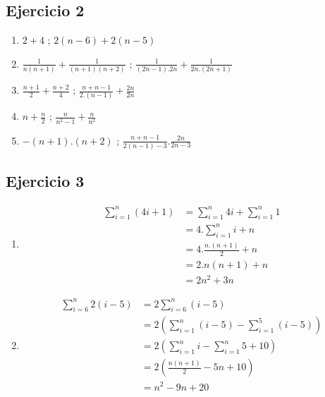 \subsection{Ejercicio 2}
\begin{enumerate}[label=(\alph*)]
    \item $2+4$ ; $2(n-6)+ 2(n-5)$
    \item $\frac{1}{n(n+1)} + \frac{1}{(n+1)(n+2)}$ ; $\frac{1}{(2n-1).2n} + \frac{1}{2n.(2n+1)}$
    \item $\frac{n+1}{2} + \frac{n+2}{4}$ ; $\frac{n+n-1}{2.(n-1)} + \frac{2n}{2n}$
    \item $n + \frac{n}{2}$ ; $\frac{n}{n^2-1} + \frac{n}{n^2}$
    \item $-(n+1) . (n+2)$ ; $\frac{n+n-1}{2(n-1)-3} . \frac{2n}{2n-3}$
\end{enumerate}

\subsection{Ejercicio 3}
\begin{enumerate}[label=(\alph*)]
    \item \begin{align*}
        \sum_{i=1}^{n}(4i+1) &= \sum_{i=1}^{n}4i + \sum_{i=1}^{n} 1 \\
        &= 4 . \sum_{i=1}^{n}i + n \\
        &= 4 . \frac{n.(n+1)}{2} + n \\
        &= 2 . n(n+1) + n \\
        &= 2n^2 + 3n
    \end{align*}
    \item \begin{align*}
        \sum_{i=6}^{n}2(i-5) &= 2\sum_{i=6}^{n}(i-5)\\
        &= 2\left( \sum_{i=1}^{n}(i-5) - \sum_{i=1}^{5}(i-5) \right) \\
        &= 2\left( \sum_{i=1}^{n}i - \sum_{i=1}^{n}5 + 10 \right) \\
        &= 2\left( \frac{n(n+1)}{2} - 5n + 10 \right) \\
        &= n^2 - 9n+20 \\
    \end{align*}
\end{enumerate}


